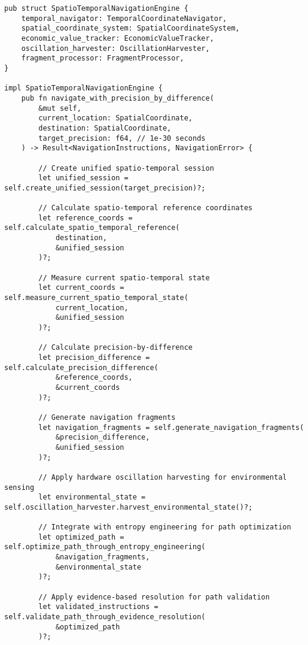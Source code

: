 \documentclass[12pt,a4paper]{article}
\begin{document}
\begin{lstlisting}[style=ruststyle, caption=Spatio-Temporal Navigation Engine]
pub struct SpatioTemporalNavigationEngine {
    temporal_navigator: TemporalCoordinateNavigator,
    spatial_coordinate_system: SpatialCoordinateSystem,
    economic_value_tracker: EconomicValueTracker,
    oscillation_harvester: OscillationHarvester,
    fragment_processor: FragmentProcessor,
}

impl SpatioTemporalNavigationEngine {
    pub fn navigate_with_precision_by_difference(
        &mut self,
        current_location: SpatialCoordinate,
        destination: SpatialCoordinate,
        target_precision: f64, // 1e-30 seconds
    ) -> Result<NavigationInstructions, NavigationError> {
        
        // Create unified spatio-temporal session
        let unified_session = self.create_unified_session(target_precision)?;
        
        // Calculate spatio-temporal reference coordinates
        let reference_coords = self.calculate_spatio_temporal_reference(
            destination,
            &unified_session
        )?;
        
        // Measure current spatio-temporal state
        let current_coords = self.measure_current_spatio_temporal_state(
            current_location,
            &unified_session
        )?;
        
        // Calculate precision-by-difference
        let precision_difference = self.calculate_precision_difference(
            &reference_coords,
            &current_coords
        )?;
        
        // Generate navigation fragments
        let navigation_fragments = self.generate_navigation_fragments(
            &precision_difference,
            &unified_session
        )?;
        
        // Apply hardware oscillation harvesting for environmental sensing
        let environmental_state = self.oscillation_harvester.harvest_environmental_state()?;
        
        // Integrate with entropy engineering for path optimization
        let optimized_path = self.optimize_path_through_entropy_engineering(
            &navigation_fragments,
            &environmental_state
        )?;
        
        // Apply evidence-based resolution for path validation
        let validated_instructions = self.validate_path_through_evidence_resolution(
            &optimized_path
        )?;
        

\end{lstlisting}
\end{document}
